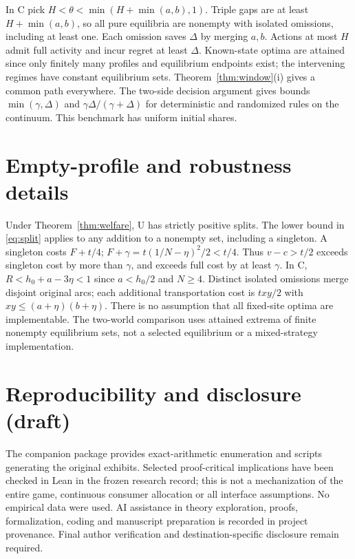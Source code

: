 \documentclass[11pt]{article}
\begin{document}
In C pick $H<\theta<\min(H+\min(a,b),1)$. Triple gaps are at least $H+\min(a,b)$, so all pure equilibria are nonempty with isolated omissions, including at least one. Each omission saves $\Delta$ by merging $a,b$. Actions at most $H$ admit full activity and incur regret at least $\Delta$. Known-state optima are attained since only finitely many profiles and equilibrium endpoints exist; the intervening regimes have constant equilibrium sets. Theorem~\ref{thm:window}(i) gives a common path everywhere. The two-side decision argument gives bounds $\min(\gamma,\Delta)$ and $\gamma\Delta/(\gamma+\Delta)$ for deterministic and randomized rules on the continuum. This benchmark has uniform initial shares.

\section{Empty-profile and robustness details}\label{app:cost}
Under Theorem~\ref{thm:welfare}, U has strictly positive splits. The lower bound in \eqref{eq:split} applies to any addition to a nonempty set, including a singleton. A singleton costs $F+t/4$; $F+\gamma=t(1/N-\eta)^2/2<t/4$. Thus $v-c>t/2$ exceeds singleton cost by more than $\gamma$, and exceeds full cost by at least $\gamma$. In C, $R<h_0+a-3\eta<1$ since $a<h_0/2$ and $N\geq4$. Distinct isolated omissions merge disjoint original arcs; each additional transportation cost is $txy/2$ with $xy\leq(a+\eta)(b+\eta)$. There is no assumption that all fixed-site optima are implementable. The two-world comparison uses attained extrema of finite nonempty equilibrium sets, not a selected equilibrium or a mixed-strategy implementation.

\section*{Reproducibility and disclosure (draft)}
The companion package provides exact-arithmetic enumeration and scripts generating the original exhibits. Selected proof-critical implications have been checked in Lean in the frozen research record; this is not a mechanization of the entire game, continuous consumer allocation or all interface assumptions. No empirical data were used. AI assistance in theory exploration, proofs, formalization, coding and manuscript preparation is recorded in project provenance. Final author verification and destination-specific disclosure remain required.
\small
\setlength{\bibsep}{0pt}


\end{document}
